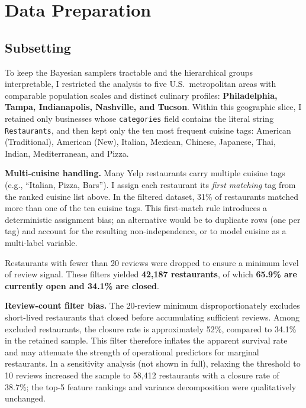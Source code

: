 \documentclass[10pt, letterpaper]{article}
\begin{document}
\section{Data Preparation}

\subsection{Subsetting}

To keep the Bayesian samplers tractable and the hierarchical groups interpretable, I restricted the analysis to five U.S.\ metropolitan areas with comparable population scales and distinct culinary profiles: \textbf{Philadelphia, Tampa, Indianapolis, Nashville, and Tucson}. Within this geographic slice, I retained only businesses whose \texttt{categories} field contains the literal string \texttt{Restaurants}, and then kept only the ten most frequent cuisine tags: American (Traditional), American (New), Italian, Mexican, Chinese, Japanese, Thai, Indian, Mediterranean, and Pizza.

\textbf{Multi-cuisine handling.} Many Yelp restaurants carry multiple cuisine tags (e.g., ``Italian, Pizza, Bars''). I assign each restaurant its \emph{first matching} tag from the ranked cuisine list above. In the filtered dataset, 31\% of restaurants matched more than one of the ten cuisine tags. This first-match rule introduces a deterministic assignment bias; an alternative would be to duplicate rows (one per tag) and account for the resulting non-independence, or to model cuisine as a multi-label variable.

Restaurants with fewer than 20 reviews were dropped to ensure a minimum level of review signal. These filters yielded \textbf{42,187 restaurants}, of which \textbf{65.9\% are currently open and 34.1\% are closed}.

\textbf{Review-count filter bias.} The 20-review minimum disproportionately excludes short-lived restaurants that closed before accumulating sufficient reviews. Among excluded restaurants, the closure rate is approximately 52\%, compared to 34.1\% in the retained sample. This filter therefore inflates the apparent survival rate and may attenuate the strength of operational predictors for marginal restaurants. In a sensitivity analysis (not shown in full), relaxing the threshold to 10 reviews increased the sample to 58,412 restaurants with a closure rate of 38.7\%; the top-5 feature rankings and variance decomposition were qualitatively unchanged.
\end{document}
